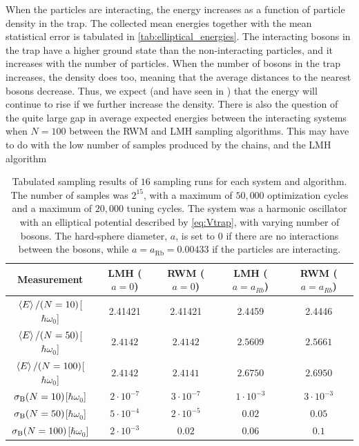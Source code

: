 When the particles are interacting, the energy increases as a function of particle density in the trap. The collected mean energies together with the mean statistical error is tabulated in \autoref{tab:elliptical_energies}. The interacting bosons in the trap have a higher ground state than the non-interacting particles, and it increases with the number of particles. When the number of bosons in the trap increases, the density does too, meaning that the average distances to the nearest bosons decrease. Thus, we expect (and have seen in \citep{DuBois2001}) that the energy will continue to rise if we further increase the density. There is also the question of the quite large gap in average expected energies between the interacting systems when $N=100$ between the RWM and LMH sampling algorithms. This may have to do with the low number of samples produced by the chains, and the LMH algorithm 


\begin{table}[h]
\caption{Tabulated sampling results of $16$ sampling runs for each system and algorithm. The number of samples was $2^{15}$, with a maximum of $50,000$ optimization cycles and a maximum of $20,000$ tuning cycles. The system was a harmonic oscillator with an elliptical potential described by \autoref{eq:Vtrap}, with varying number of bosons. The hard-sphere diameter, $a$, is set to $0$ if there are no interactions between the bosons, while $a=a_{\mathrm{Rb}}=0.00433$ if the particles are interacting.}
\centering
\begin{tabular}{ccccc}
\hline\hline
Measurement & LMH ($a=0$) & RWM ($a=0$) & LMH ($a=a_{Rb}$) & RWM ($a=a_{Rb}$)
\\
\hline \hline
$\expval{E}/(N=10)$[$\hbar\omega_0$] & 2.41421 & 2.41421 & 2.4459 & 2.4446  
\\
$\expval{E}/(N=50)$[$\hbar\omega_0$] & $2.4142$ & $2.4142$ & $2.5609$ & $2.5661$ 
\\
$\expval{E}/(N=100)$[$\hbar\omega_0$] & $2.4142$ & $2.4141$ & $2.6750$ & $2.6950$ 
\\
$\sigma_{\mathrm{B}}\qty(N=10)$[$\hbar\omega_0$] & $2\cdot10^{-7}$ & $3\cdot10^{-7}$ & $1\cdot10^{-3}$ & $3\cdot10^{-3}$ 
\\
$\sigma_{\mathrm{B}}\qty(N=50)$[$\hbar\omega_0$] & $5\cdot10^{-4}$ & $2\cdot10^{-5}$ & $0.02$ & $0.05$
\\
$\sigma_{\mathrm{B}}\qty(N=100)$[$\hbar\omega_0$] & $2\cdot10^{-3}$ & $0.02$ & $0.06$ & $0.1$
\\
\hline\hline
\end{tabular}
\label{tab:elliptical_energies}
\end{table}

